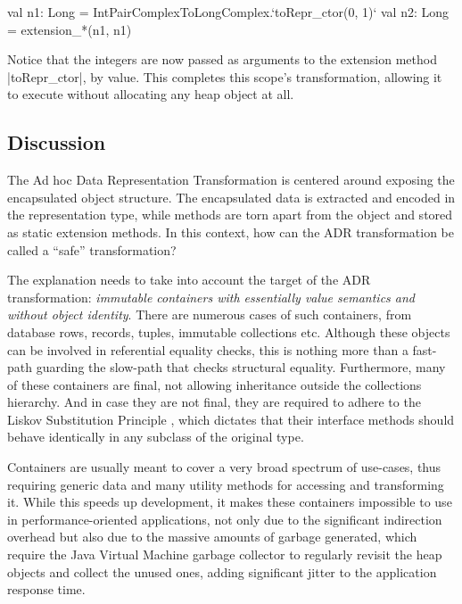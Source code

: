 \begin{lstlisting-nobreak}
val n1: Long = IntPairComplexToLongComplex.`toRepr_ctor(0, 1)`
val n2: Long = extension_*(n1, n1)
\end{lstlisting-nobreak}

Notice that the integers are now passed as arguments to the extension method |toRepr_ctor|, by value. This completes this scope's transformation, allowing it to execute without allocating any heap object at all.



\subsection{Discussion}
\label{sec:ildl:discussion}
The Ad hoc Data Representation Transformation is centered around exposing the encapsulated object structure. The encapsulated data is extracted and encoded in the representation type, while methods are torn apart from the object and stored as static extension methods. In this context, how can the ADR transformation be called a ``safe'' transformation?

The explanation needs to take into account the target of the ADR transformation: \emph{immutable containers with essentially value semantics and without object identity}. There are numerous cases of such containers, from database rows, records, tuples, immutable collections etc. Although these objects can be involved in referential equality checks, this is nothing more than a fast-path guarding the slow-path that checks structural equality. Furthermore, many of these containers are final, not allowing inheritance outside the collections hierarchy. And in case they are not final, they are required to adhere to the Liskov Substitution Principle \cite{liskov-substitution-principle}, which dictates that their interface methods should behave identically in any subclass of the original type.

Containers are usually meant to cover a very broad spectrum of use-cases, thus requiring generic data and many utility methods for accessing and transforming it. While this speeds up development, it makes these containers impossible to use in performance-oriented applications, not only due to the significant indirection overhead but also due to the massive amounts of garbage generated, which require the Java Virtual Machine garbage collector to regularly revisit the heap objects and collect the unused ones, adding significant jitter to the application response time.

